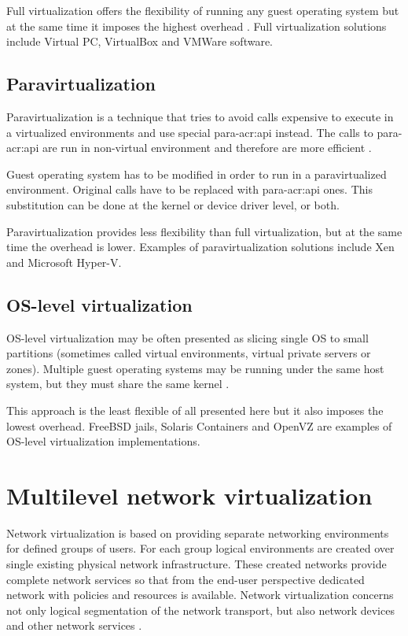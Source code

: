 \documentclass[11pt,openany]{book}
\begin{document}
        Full virtualization offers the flexibility of running any guest operating system but at the same time it imposes
        the highest overhead \cite{turban}. Full virtualization solutions include Virtual PC, VirtualBox and VMWare
        software.


      \subsection{Paravirtualization}

        Paravirtualization is a technique that tries to avoid calls expensive to execute in a virtualized environments
        and use special para-\gls{acr:api} instead. The calls to para-\gls{acr:api} are run in non-virtual environment
        and therefore are more efficient \cite{crosby}.

        Guest operating system has to be modified in order to run in a paravirtualized environment. Original calls have
        to be replaced with para-\gls{acr:api} ones. This substitution can be done at the kernel or device driver level,
        or both.

        Paravirtualization provides less flexibility than full virtualization, but at the same time the overhead is
        lower. Examples of paravirtualization solutions include Xen and Microsoft Hyper-V.


      \subsection{OS-level virtualization}

        OS-level virtualization may be often presented as slicing single OS to small partitions (sometimes called
        virtual environments, virtual private servers or zones). Multiple guest operating systems may be running under
        the same host system, but they must share the same kernel \cite{turban}.

        This approach is the least flexible of all presented here but it also imposes the lowest overhead. FreeBSD
        jails, Solaris Containers and OpenVZ are examples of OS-level virtualization implementations.
                

    \section{Multilevel network virtualization}
    \label{sec:ctx:multi}

      Network virtualization is based on providing separate networking environments for defined groups of users. For
      each group logical environments are created over single existing physical network infrastructure. These created
      networks provide complete network services so that from the end-user perspective dedicated network with policies
      and resources is available. Network virtualization concerns not only logical segmentation of the network
      transport, but also network devices and other network services \cite{network_virt}.
\end{document}
